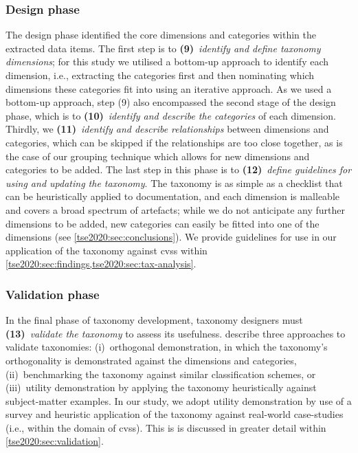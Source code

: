 \subsubsection{Design phase} \label{tse2020:sec:method:taxonomy-development:design-phase} The design phase identified the core dimensions and categories within the extracted data items. The first step is to \textbf{(9)}~\textit{identify and define taxonomy dimensions}; for this study we utilised a bottom-up approach to identify each dimension, i.e., extracting the categories first and then nominating which dimensions these categories fit into using an iterative approach. As we used a bottom-up approach, step (9) also encompassed the second stage of the design phase, which is to \textbf{(10)}~\textit{identify and describe the categories} of each dimension. Thirdly, we \textbf{(11)}~\textit{identify and describe relationships} between dimensions and categories, which can be skipped if the relationships are too close together, as is the case of our grouping technique which allows for new dimensions and categories to be added. The last step in this phase is to \textbf{(12)}~\textit{define guidelines for using and updating the taxonomy}. The taxonomy is as simple as a checklist that can be heuristically applied to  documentation, and each dimension is malleable and covers a broad spectrum of artefacts; while we do not anticipate any further dimensions to be added, new categories can easily be fitted into one of the dimensions (see \cref{tse2020:sec:conclusions}). We provide guidelines for use in our application of the taxonomy against \glspl{cvs} within \cref{tse2020:sec:findings,tse2020:sec:tax-analysis}.

\subsubsection{Validation phase} In the final phase of taxonomy development, taxonomy designers must \textbf{(13)}~\textit{validate the taxonomy} to assess its usefulness. \citet{Usman:2017hn} describe three approaches to validate taxonomies: (i)~orthogonal demonstration, in which the taxonomy's orthogonality is demonstrated against the dimensions and categories, (ii)~benchmarking the taxonomy against similar classification schemes, or (iii)~utility demonstration by applying the taxonomy heuristically against subject-matter examples. In our study, we adopt utility demonstration by use of a survey and heuristic application of the taxonomy against real-world case-studies (i.e., within the domain of \glspl{cvs}). This is is discussed in greater detail within \cref{tse2020:sec:validation}.


